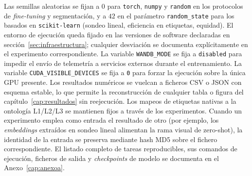 Las semillas aleatorias se fijan a $0$ para \texttt{torch},
\texttt{numpy} y \texttt{random} en los protocolos de
\emph{fine-tuning} y segmentación, y a $42$ en el parámetro
\texttt{random\_state} para los basados en \texttt{scikit-learn}
(sondeo lineal, eficiencia en etiquetas, equidad). El entorno de
ejecución queda fijado en las versiones de software declaradas en
secci\'on~\ref{sec:infraestructura}; cualquier desviación se documenta
explícitamente en el experimento correspondiente. La variable
\texttt{WANDB\_MODE} se fija a \texttt{disabled} para impedir el
envío de telemetría a servicios externos durante el
entrenamiento. La variable \texttt{CUDA\_VISIBLE\_DEVICES} se fija
a \texttt{0} para forzar la ejecución sobre la única GPU presente.
Los resultados numéricos se vuelcan a ficheros CSV o JSON con
esquema estable, lo que permite la reconstrucción de cualquier
tabla o figura del capítulo~\ref{cap:resultados} sin reejecución.
Los mapeos de etiquetas nativas a la ontología L1/L2/L3 se mantienen
fijos a través de los experimentos. Cuando un experimento emplea
como entrada el resultado de otro (por ejemplo, los \emph{embeddings}
extraídos en sondeo lineal alimentan la rama visual de zero-shot),
la identidad de la entrada se preserva mediante hash MD5 sobre el
fichero correspondiente. El listado completo de tareas
reproducibles, sus comandos de ejecución, ficheros de salida y
\emph{checkpoints} de modelo se documenta en el
Anexo~\ref{cap:anexoa}.

